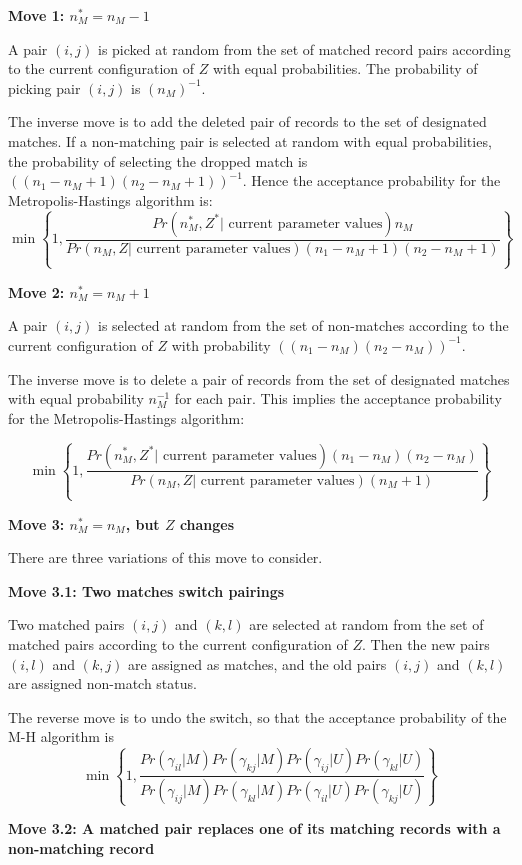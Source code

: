 \documentclass[11pt,reqno]{amsart}
\begin{document}
\textbf{Move 1: $n_M^* = n_M - 1 $ }

A pair $(i,j)$ is picked at random from the set of matched record pairs according to the current configuration of $Z$ with equal probabilities.  The probability of picking pair $(i,j)$ is $(n_M)^{-1}$. 

The inverse move is to add the deleted pair of records to the set of designated matches.  If a non-matching pair is selected at random with equal probabilities, the probability of selecting the dropped match is $\left((n_1 - n_M + 1)(n_2 - n_M + 1)\right)^{-1}$.  Hence the acceptance probability for the Metropolis-Hastings algorithm is:
\[ \min \left\{ 1, \frac{Pr\left(n_M^*, Z^* | \text{ current parameter values}\right)  n_M}{Pr\left(n_M, Z | \text{ current parameter values}\right) (n_1 - n_M + 1)(n_2 - n_M + 1)}\right\} \] 

\textbf{Move 2: $n_M^* = n_M + 1 $ }

A pair $(i,j)$ is selected at random from the set of non-matches according to the current configuration of $Z$ with probability $\left((n_1-n_M)(n_2-n_M)\right)^{-1}$.  

The inverse move is to delete a pair of records from the set of designated matches with equal probability $n_M^{-1}$ for each pair.  This implies the acceptance probability for the Metropolis-Hastings algorithm:

\[ \min \left\{ 1, \frac{Pr\left(n_M^*, Z^* | \text{ current parameter values}\right)(n_1 - n_M)(n_2 - n_M)}{Pr\left(n_M, Z | \text{ current parameter values}\right)(n_M + 1)} \right\} \] 

\textbf{Move 3: $n_M^* = n_M$, but $Z$ changes} 

There are three variations of this move to consider. 

\textbf{Move 3.1: Two matches switch pairings}

Two matched pairs $(i,j)$ and $(k, l)$ are selected at random from the set of matched pairs according to the current configuration of $Z$.   Then the new pairs $(i,l)$ and $(k,j)$ are assigned as matches, and the old pairs $(i,j)$ and $(k,l)$ are assigned non-match status. 

The reverse move is to undo the switch, so that the acceptance probability of the M-H algorithm is
\[ \min \left\{ 1, \frac{Pr(\gamma_{il} | M) Pr(\gamma_{kj} | M) Pr(\gamma_{ij} | U) Pr(\gamma_{kl} | U)}{Pr(\gamma_{ij} | M) Pr(\gamma_{kl} | M) Pr(\gamma_{il} | U) Pr(\gamma_{kj} | U)} \right\} \] 

\textbf{Move 3.2: A matched pair replaces one of its matching records with a non-matching record}
\end{document}
